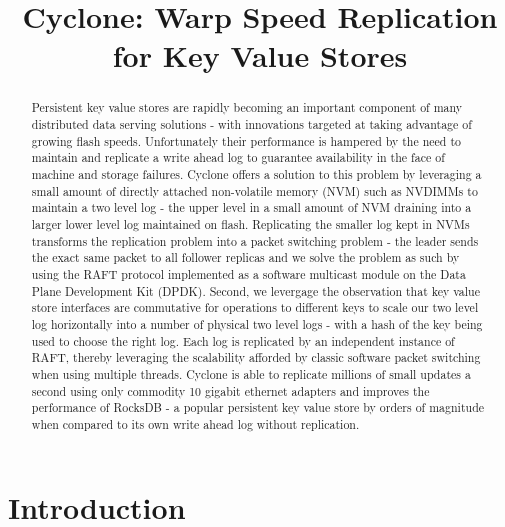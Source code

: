 \documentclass[10pt, preprint, nonatbib]{sigplanconf}
\date{}
\begin{document}
\title{\Large \bf Cyclone: Warp Speed Replication for Key Value Stores}

\maketitle


\begin{abstract}
Persistent key value stores are rapidly becoming an important component of many
distributed data serving solutions - with innovations targeted at taking
advantage of growing flash speeds. Unfortunately their performance is hampered
by the need to maintain and replicate a write ahead log to guarantee
availability in the face of machine and storage failures. Cyclone offers a
solution to this problem by leveraging a small amount of directly attached
non-volatile memory (NVM) such as NVDIMMs to maintain a two level log - the upper
level in a small amount of NVM draining into a larger lower level log
maintained on flash. Replicating the smaller log kept in NVMs transforms the
replication problem into a packet switching problem - the leader sends the exact
same packet to all follower replicas and we solve the problem as such by using
the RAFT protocol implemented as a software multicast module on the Data Plane
Development Kit (DPDK). Second, we levergage the observation that key value store
interfaces are commutative for operations to different keys to scale our two
level log horizontally into a number of physical two level logs - with a hash of
the key being used to choose the right log. Each log is replicated by an
independent instance of RAFT, thereby leveraging the scalability afforded by
classic software packet switching when using multiple threads. Cyclone is able
to replicate millions of small updates a second using only commodity 10 gigabit
ethernet adapters and improves the performance of RocksDB - a popular persistent
key value store by orders of magnitude when compared to its own write ahead log
without replication.
\end{abstract}

\section{Introduction}
\end{document}

